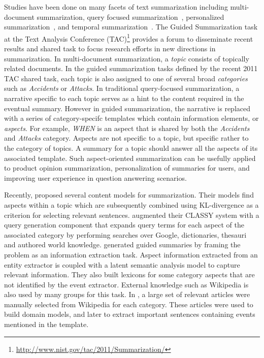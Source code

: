 Studies have been done on many facets of text summarization including multi-document summarization, query focused summarization~\cite{summ:multidoc}, personalized summarization~\cite{summ:personalized}, and temporal summarization~\cite{ICON_2009}. The Guided Summarization task at the Text Analysis Conference (TAC)\footnote{\url{http://www.nist.gov/tac/2011/Summarization/}} provides a forum to disseminate recent results and shared task to focus research efforts in new directions in summarization. In multi-document summarization, a \textit{topic} consists of topically related documents.  In the guided summarization tasks defined by the recent 2011 TAC shared task, each topic is also assigned to one of several broad \textit{categories} such as \emph{Accidents} or \emph{Attacks}. In traditional query-focused summarization, a narrative specific to each topic serves as a hint to the content required in the eventual summary. However in guided summarization, the narrative is replaced with a series of category-specifc templates which contain information elements, or \emph{aspects}.
For example, \emph{WHEN} is an aspect that is shared by both the \emph{Accidents} and \emph{Attacks} category.
Aspects are not specific to a topic, but specific rather to the category of topics. A summary for a topic should answer all the aspects of its associated template. Such aspect-oriented summarization can be usefully applied to product opinion summarization, personalization of summaries for users, and improving user experience in question answering scenarios.

Recently,  proposed several content models for summarization. Their models find aspects within a topic which are subsequently combined using KL-divergence as a criterion for selecting relevant sentences.  augmented their CLASSY system with a query generation component that expands query terms for each aspect of the associated category by performing searches over Google, dictionaries, thesauri and authored world knowledge.  generated guided summaries by framing the problem as an information extraction task. Aspect information extracted from an entity extractor is coupled with a latent semantic analysis model to capture relevant information. They also built lexicons for some category aspects that are not identified by the event extractor.  External knowledge such as Wikipedia is also used by many groups for this task. In \cite{IIIT-TAC2010}, a large set of relevant articles were manually selected from Wikipedia for each category. These articles were used to build domain models, and later to extract important sentences containing events mentioned in the template.

